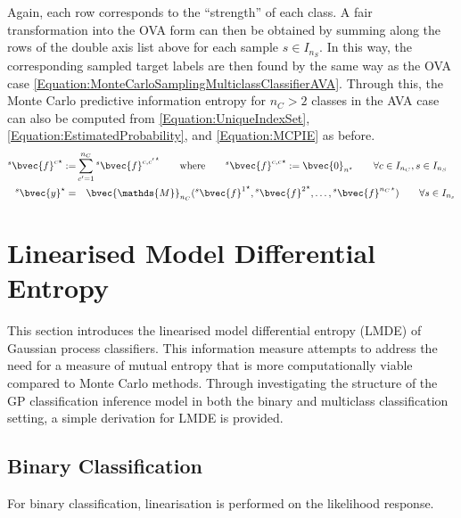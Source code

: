 				Again, each row corresponds to the ``strength'' of each class. A fair transformation into the OVA form can then be obtained by summing along the rows of the double axis list above for each sample $s \in I_{n_{S}}$. In this way, the corresponding sampled target labels are then found by the same way as the OVA case \eqref{Equation:MonteCarloSamplingMulticlassClassifierAVA}. Through this, the Monte Carlo predictive information entropy for $n_{C} > 2$ classes in the AVA case can also be computed from \eqref{Equation:UniqueIndexSet}, \eqref{Equation:EstimatedProbability}, and \eqref{Equation:MCPIE} as before. \begin{equation}
					\begin{aligned}
						{^{s}}{\bvec{f}^{c}}^{\star} :=& \sum_{c' = 1}^{n_{C}} {^{s}}{\bvec{f}^{c, c'}}^{\star} \qquad \text{where} \qquad {^{s}}{\bvec{f}^{c, c}}^{\star} := \bvec{0}_{n^{\star}} \qquad \forall c \in I_{n_{C}}, s \in I_{n_{S}} \\
						{^{s}}\bvec{y}^{\star} =& \quad \bvec{\mathds{M}}_{n_{C}}({^{s}}{\bvec{f}^{1}}^{\star}, {^{s}}{\bvec{f}^{2}}^{\star}, \dots, {^{s}}{\bvec{f}^{n_{C}}}^{\star}) \qquad \forall s \in I_{n_{s}}
					\end{aligned}
				\label{Equation:MonteCarloSamplingMulticlassClassifierAVA}
				\end{equation}
					
	\section{Linearised Model Differential Entropy}
	\label{InformativeSeafloorExploration:LMDE}
	
		This section introduces the linearised model differential entropy (LMDE) of Gaussian process classifiers. This information measure attempts to address the need for a measure of mutual entropy that is more computationally viable compared to Monte Carlo methods. Through investigating the structure of the GP classification inference model in both the binary and multiclass classification setting, a simple derivation for LMDE is provided.
		
		\subsection{Binary Classification}
		\label{InformativeSeafloorExploration:LMDE:Binary}
		
			For binary classification, linearisation is performed on the likelihood response.
					

